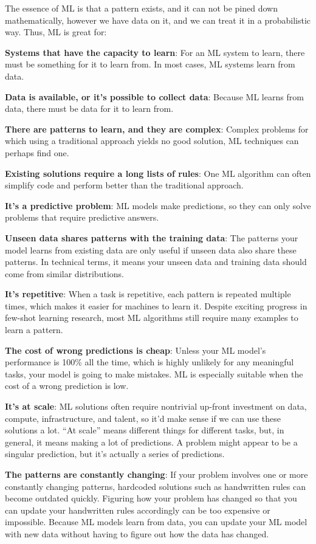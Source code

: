The essence of ML is that a pattern exists, and it can not be pined down mathematically, however we have
data on it, and we can treat it in a probabilistic way. Thus, ML is great for:
\bit
\item \textbf{Systems that have the capacity to learn}: For an ML system to learn, there must be something for it to
learn from. In most cases, ML systems learn from data.
\item \textbf{Data is available, or it's possible to collect data}: Because ML learns from data, there must be data for
it to learn from.
\item \textbf{There are patterns to learn, and they are complex}: Complex problems for which using a traditional
approach yields no good solution, ML techniques can perhaps find one.
\item \textbf{Existing solutions require a long lists of rules}: One ML algorithm can often simplify code and perform
better than the traditional approach.
\item \textbf{It's a predictive problem}: ML models make predictions, so they can only solve problems that require
predictive answers.
\item \textbf{Unseen data shares patterns with the training data}: The patterns your model learns from existing data are
only useful if unseen data also share these patterns. In technical terms, it means your unseen data and training data
should come from similar distributions.
\item \textbf{It's repetitive}: When a task is repetitive, each pattern is repeated multiple times, which makes it
easier for machines to learn it. Despite exciting progress in few-shot learning research, most ML algorithms still
require many examples to learn a pattern.
\item \textbf{The cost of wrong predictions is cheap}: Unless your ML model's performance is 100\% all the time, which is
highly unlikely for any meaningful tasks, your model is going to make mistakes. ML is especially suitable when the cost
of a wrong prediction is low.
\item \textbf{It's at scale}: ML solutions often require nontrivial up-front investment on data, compute, infrastructure,
and talent, so it'd make sense if we can use these solutions a lot. ``At scale'' means different things for different
tasks, but, in general, it means making a lot of predictions. A problem might appear to be a singular prediction, but
it's actually a series of predictions.
\item \textbf{The patterns are constantly changing}: If your problem involves one or more constantly changing patterns,
hardcoded solutions such as handwritten rules can become outdated quickly. Figuring how your problem has changed so that
you can update your handwritten rules accordingly can be too expensive or impossible. Because ML models learn from data,
you can update your ML model with new data without having to figure out how the data has changed.
\eit

